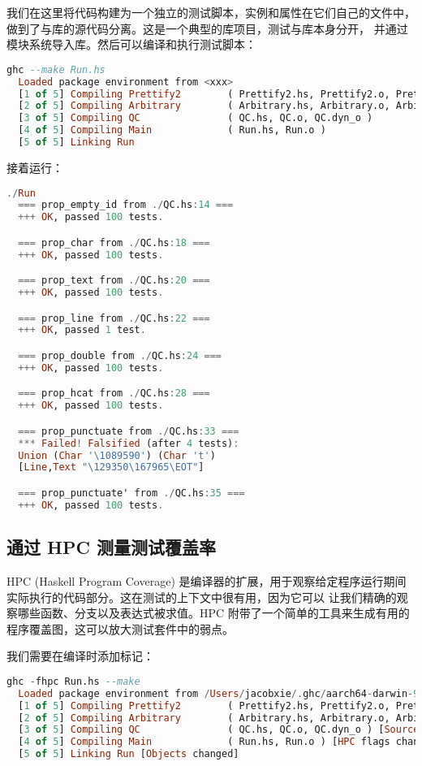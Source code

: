 \documentclass[./main.tex]{subfiles}
\begin{document}
我们在这里将代码构建为一个独立的测试脚本，实例和属性在它们自己的文件中，做到了与库的源代码分离。这是一个典型的库项目，测试与库本身分开，
并通过模块系统导入库。然后可以编译和执行测试脚本：

\begin{lstlisting}[language=Haskell]
  ghc --make Run.hs
  Loaded package environment from <xxx>
  [1 of 5] Compiling Prettify2        ( Prettify2.hs, Prettify2.o, Prettify2.dyn_o )
  [2 of 5] Compiling Arbitrary        ( Arbitrary.hs, Arbitrary.o, Arbitrary.dyn_o )
  [3 of 5] Compiling QC               ( QC.hs, QC.o, QC.dyn_o )
  [4 of 5] Compiling Main             ( Run.hs, Run.o )
  [5 of 5] Linking Run
\end{lstlisting}

接着运行：

\begin{lstlisting}[language=Haskell]
  ./Run
  === prop_empty_id from ./QC.hs:14 ===
  +++ OK, passed 100 tests.

  === prop_char from ./QC.hs:18 ===
  +++ OK, passed 100 tests.

  === prop_text from ./QC.hs:20 ===
  +++ OK, passed 100 tests.

  === prop_line from ./QC.hs:22 ===
  +++ OK, passed 1 test.

  === prop_double from ./QC.hs:24 ===
  +++ OK, passed 100 tests.

  === prop_hcat from ./QC.hs:28 ===
  +++ OK, passed 100 tests.

  === prop_punctuate from ./QC.hs:33 ===
  *** Failed! Falsified (after 4 tests):
  Union (Char '\1089590') (Char 't')
  [Line,Text "\129350\167965\EOT"]

  === prop_punctuate' from ./QC.hs:35 ===
  +++ OK, passed 100 tests.
\end{lstlisting}

\subsection*{通过 HPC 测量测试覆盖率}

HPC (Haskell Program Coverage) 是编译器的扩展，用于观察给定程序运行期间实际执行的代码部分。这在测试的上下文中很有用，因为它可以
让我们精确的观察哪些函数、分支以及表达式被求值。HPC 附带了一个简单的工具来生成有用的程序覆盖图，这可以放大测试套件中的弱点。

我们需要在编译时添加标记：

\begin{lstlisting}[language=Haskell]
  ghc -fhpc Run.hs --make
  Loaded package environment from /Users/jacobxie/.ghc/aarch64-darwin-9.4.7/environments/default
  [1 of 5] Compiling Prettify2        ( Prettify2.hs, Prettify2.o, Prettify2.dyn_o ) [HPC flags changed]
  [2 of 5] Compiling Arbitrary        ( Arbitrary.hs, Arbitrary.o, Arbitrary.dyn_o ) [HPC flags changed]
  [3 of 5] Compiling QC               ( QC.hs, QC.o, QC.dyn_o ) [Source file changed]
  [4 of 5] Compiling Main             ( Run.hs, Run.o ) [HPC flags changed]
  [5 of 5] Linking Run [Objects changed]
\end{lstlisting}
\end{document}
